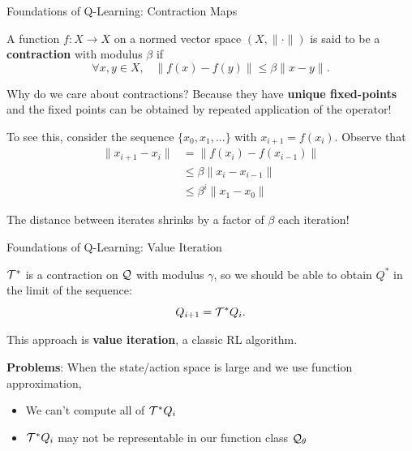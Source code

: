 \documentclass[9pt]{beamer}
\begin{document}
\begin{frame}{Foundations of Q-Learning: Contraction Maps}

A function $f: X \to X$ on a normed vector space $(X, \|\cdot\|)$ is said to be a \textbf{contraction} with modulus $\beta$ if
%
\begin{equation*}
\forall x, y \in X, \;\;\; \|f(x) - f(y)\| \leq \beta \|x - y\|.
\end{equation*}

\vspace{2em}
Why do we care about contractions? Because they have \textbf{unique fixed-points} and the fixed points can be obtained by repeated application of the operator!

\vspace{2em}
To see this, consider the sequence $\{x_0, x_1, ...\}$ with $x_{i+1} = f(x_i)$. Observe that
%
\begin{align*}
\|x_{i+1} - x_i\| &= \|f(x_i) - f(x_{i-1})\|\\
&\leq \beta \|x_{i} - x_{i-1}\| \\
&\leq \beta^i \|x_1 - x_0\|
\end{align*}

The distance between iterates shrinks by a factor of $\beta$ each iteration!

\end{frame}

\begin{frame}{Foundations of Q-Learning: Value Iteration}

${\mathcal T}^*$ is a contraction on ${\mathcal Q}$ with modulus $\gamma$, so we should be able to obtain $Q^*$ in the limit of the sequence:
%
\begin{equation*}
Q_{i+1} = {\mathcal T}^* Q_i.
\end{equation*}

This approach is \textbf{value iteration}, a classic RL algorithm. 

\vspace{2em}

\textbf{Problems}: When the state/action space is large and we use function approximation, 
%
\begin{itemize}
\item We can't compute all of ${\mathcal T}^*Q_i$
\item ${\mathcal T}^* Q_i$ may not be representable in our function class ${\mathcal Q}_{\theta}$
\end{itemize}

\end{frame}
\end{document}
